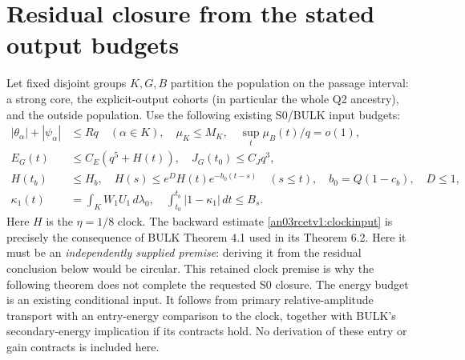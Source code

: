 \documentclass[11pt]{article}
\newcommand{\dd}{\,d}
\begin{document}
\section{Residual closure from the stated output budgets}
Let fixed disjoint groups $K,G,B$ partition the population on the
passage interval: a strong core, the explicit-output cohorts (in
particular the whole Q2 ancestry), and the outside population.
Use the following existing S0/BULK input budgets:
\begin{align}
 |\theta_\alpha|+|\psi_\alpha|&\le Rq\quad(\alpha\in K),
 \quad \mu_K\le M_K,\quad
 \sup_t\mu_B(t)/q=o(1), \label{an03rcetv1:coreinputs}\\
 E_G(t)&\le C_E(q^5+H(t)),\quad J_G(t_0)\le C_Jq^3,
 \label{an03rcetv1:energyinputs}\\
 H(t_b)&\le H_b,\quad
 H(s)\le e^D H(t)e^{-b_0(t-s)}\quad(s\le t),
 \quad b_0=Q(1-c_b),\quad D\le1, \label{an03rcetv1:clockinput}\\
 \kappa_1(t)&=\int_K W_1U_1\dd\lambda_0,\quad
 \int_{t_0}^{t_b}|1-\kappa_1|\dd t\le B_s.
 \label{an03rcetv1:learninginput}
\end{align}
Here $H$ is the $\eta=1/8$ clock. The backward estimate
\eqref{an03rcetv1:clockinput} is precisely the consequence of
BULK Theorem 4.1 used in its Theorem 6.2. Here it must be an
\emph{independently supplied premise}: deriving it from the residual
conclusion below would be circular. This retained clock premise is
why the following theorem does not complete the requested S0 closure.
The energy budget is an existing
conditional input. It follows from primary relative-amplitude
transport with an entry-energy comparison to the clock, together
with BULK's secondary-energy implication if its contracts hold.
No derivation of these entry or gain contracts is included here.
\end{document}
